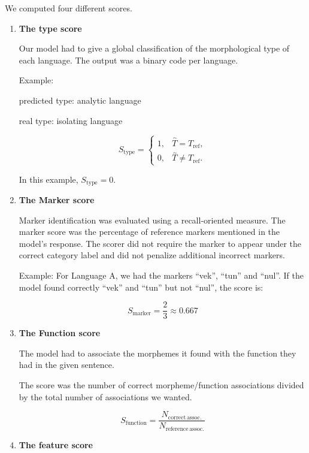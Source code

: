 \documentclass[11pt]{article}
\begin{document}
We computed four different scores.~

\begin{enumerate}
    \item \textbf{The type score}

    Our model had to give a global classification of the morphological type of each language. The output was a binary code per language.

    Example:

    predicted type: analytic language

    real type: isolating language

    \[
    S_{\mathrm{type}}=
    \left\{
    \begin{array}{ll}
    1, & \hat{T}=T_{\mathrm{ref}},\\[2pt]
    0, & \hat{T}\neq T_{\mathrm{ref}}.
    \end{array}
    \right.
    \]

    In this example, $S_{\mathrm{type}}=0$.

    \item \textbf{The Marker score}

    Marker identification was evaluated using a recall-oriented measure. The marker score was the percentage of reference markers mentioned in the model's response. The scorer did not require the marker to appear under the correct category label and did not penalize additional incorrect markers.

    Example: For Language A, we had the markers ``vek'', ``tun'' and ``nul''. If the model found correctly ``vek'' and ``tun'' but not ``nul'', the score is:

    \[
    S_{\mathrm{marker}} = \frac{2}{3} \approx 0.667
    \]

    \item \textbf{The Function score}

    The model had to associate the morphemes it found with the function they had in the given sentence.

    The score was the number of correct morpheme/function associations divided by the total number of associations we wanted.

    \[
    S_{\mathrm{function}} =
    \frac{N_{\mathrm{correct\,assoc.}}}
         {N_{\mathrm{reference\,assoc.}}}
    \]

    \item \textbf{The feature score}


\end{enumerate}
\end{document}
